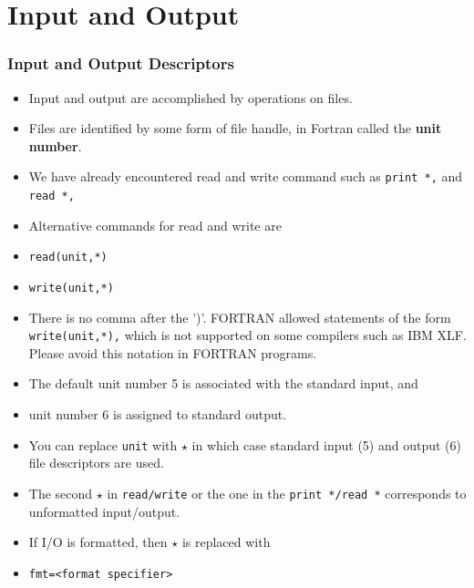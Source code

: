 \documentclass[c,mathserif,compress,xcolor=svgnames]{beamer}
\newcommand{\lstfortran}[1]{\lstinline[language={[90]Fortran},basicstyle=\footnotesize\ttfamily]|#1|}
\begin{document}
\section{Input and Output}
\begin{frame}
  \frametitle{Input and Output Descriptors}
  \begin{itemize}
    \item Input and output are accomplished by operations on files.
    \item Files are identified by some form of file handle, in Fortran called the \textbf{unit number}.
    \item We have already encountered read and write command such as \lstfortran{print *,} and \lstfortran{read *,}
    \item Alternative commands for read and write are 
    \item[] \lstfortran{read(unit,*)}
    \item[] \lstfortran{write(unit,*)}
    \item There is no comma after the ')'. FORTRAN allowed statements of the form \lstfortran{write(unit,*),} which is not supported on some compilers such as IBM XLF. Please avoid this notation in FORTRAN programs.
    \item The default unit number 5 is associated with the standard input, and
    \item unit number 6 is assigned to standard output.
    \item You can replace \lstfortran{unit} with $\star$ in which case standard input (5) and output (6) file descriptors are used.
    \item The second $\star$ in \lstfortran{read/write} or the one in the \lstfortran{print */read *} corresponds to unformatted input/output.
    \item If I/O is formatted, then $\star$ is replaced with
    \item[]\lstfortran{fmt=<format specifier>}
  \end{itemize}
\end{frame}
\end{document}

